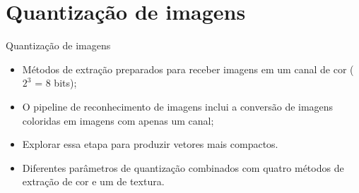 \documentclass{beamer}
\begin{document}
\section{Quantização de imagens}
\begin{frame}{Quantização de imagens}
  \setlength\leftmargini{1em}
  \begin{block}{}
    \justifying
    \begin{itemize}
      \item Métodos de extração preparados para receber imagens em um canal de cor ($2^3$ = 8 bits);
      \item O pipeline de reconhecimento de imagens inclui a conversão de imagens coloridas em imagens com apenas um canal;
      \item Explorar essa etapa para produzir vetores mais compactos.
      \item Diferentes parâmetros de quantização combinados com quatro métodos de extração de cor e um de textura.
    \end{itemize}
  \end{block}
\end{frame}
\end{document}
